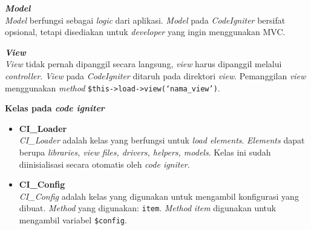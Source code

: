 \documentclass[a4paper,twoside]{article}
\begin{document}
\begin{enumerate}
\begin{enumerate}
		 \textbf{\textit{Model}} \\ \textit{Model} berfungsi sebagai \textit{logic} dari aplikasi. \textit{Model} pada \textit{CodeIgniter} bersifat opsional, tetapi disediakan untuk \textit{developer} yang ingin menggunakan MVC. 
		 
		\textbf{\textit{View}} \\
		\textit{View} tidak pernah dipanggil secara langsung, \textit{view} harus dipanggil melalui \textit{controller}. \textit{View} pada \textit{CodeIgniter} ditaruh pada direktori \textit{view}. Pemanggilan \textit{view} menggunakan \textit{method} \texttt{\$this->load->view(`nama\_view')}.
		
		\textbf{Kelas pada \textit{code igniter}} 
		\begin{itemize}
			\item \textbf{CI\_Loader} \\ 
			\textit{CI\_Loader} adalah kelas yang berfungsi untuk \textit{load elements}. \textit{Elements} dapat berupa \textit{libraries, view files, drivers, helpers, models}. Kelas ini sudah diinisialisasi secara otomatis oleh \textit{code igniter}.
			
			\item \textbf{CI\_Config} \\
			\textit{CI\_Config} adalah kelas yang digunakan untuk mengambil konfigurasi yang dibuat. \textit{Method} yang digunakan: \texttt{item}. \textit{Method} \textit{item} digunakan untuk mengambil variabel \texttt{\$config}.
			

\end{itemize}
\end{enumerate}
\end{enumerate}
\end{document}
